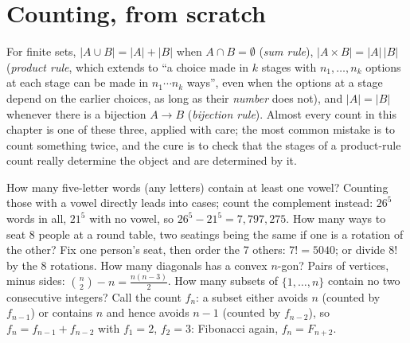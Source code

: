 
\section{Counting, from scratch}

\begin{reminder}
For finite sets, $|A\cup B|=|A|+|B|$ when $A\cap B=\emptyset$ (\emph{sum rule}), $|A\times B|=|A|\,|B|$ (\emph{product rule}, which extends to ``a choice made in $k$ stages with $n_1,\dots,n_k$ options at each stage can be made in $n_1\cdots n_k$ ways'', even when the options at a stage depend on the earlier choices, as long as their \emph{number} does not), and $|A|=|B|$ whenever there is a bijection $A\to B$ (\emph{bijection rule}). Almost every count in this chapter is one of these three, applied with care; the most common mistake is to count something twice, and the cure is to check that the stages of a product-rule count really determine the object and are determined by it.
\end{reminder}

\begin{examplex}
How many five-letter words (any letters) contain at least one vowel? Counting those with a vowel directly leads into cases; count the complement instead: $26^5$ words in all, $21^5$ with no vowel, so $26^5-21^5=7{,}797{,}275$. How many ways to seat $8$ people at a round table, two seatings being the same if one is a rotation of the other? Fix one person's seat, then order the $7$ others: $7!=5040$; or divide $8!$ by the $8$ rotations. How many diagonals has a convex $n$-gon? Pairs of vertices, minus sides: $\binom n2-n=\frac{n(n-3)}2$. How many subsets of $\{1,\dots,n\}$ contain no two consecutive integers? Call the count $f_n$: a subset either avoids $n$ (counted by $f_{n-1}$) or contains $n$ and hence avoids $n-1$ (counted by $f_{n-2}$), so $f_n=f_{n-1}+f_{n-2}$ with $f_1=2$, $f_2=3$: Fibonacci again, $f_n=F_{n+2}$.
\end{examplex}

